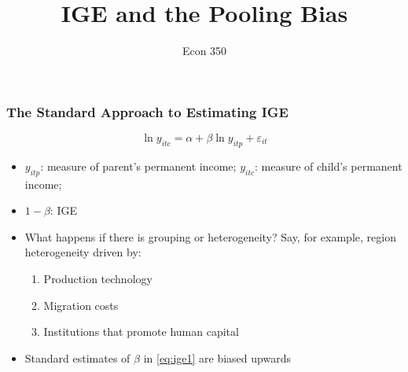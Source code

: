 

\title{IGE and the Pooling Bias}
\subtitle{}
\author{Econ 350}






\begin{frame}[plain]
	\titlepage
\end{frame}

\begin{frame}
	\frametitle{The Standard Approach to Estimating IGE}
	\begin{equation}
		\ln y_{itc} = \alpha + \beta \ln y_{itp} + \varepsilon_{it} \label{eq:ige1}
	\end{equation}

	\begin{itemize}
		\item $y_{itp}$: measure of parent's permanent income; $y_{itc}$: measure of child's permanent income; \item $1 - \beta$: IGE
\end{itemize}

	\begin{itemize}
	\item What happens if there is grouping or heterogeneity? Say, for example, region heterogeneity driven by:
		\begin{enumerate}
			\item Production technology
			\item Migration costs
			\item Institutions that promote human capital
		\end{enumerate}
	\item Standard estimates of $\beta$ in \eqref{eq:ige1} are biased upwards
	\end{itemize}
\end{frame}


